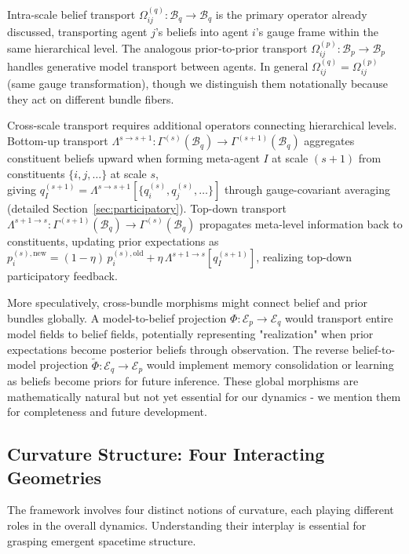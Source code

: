 \documentclass[11pt]{article}
\begin{document}
Intra-scale belief transport $\Omega^{(q)}_{ij}: \mathcal{B}_q \to \mathcal{B}_q$ is the primary operator already discussed, transporting agent $j$'s beliefs into agent $i$'s gauge frame within the same hierarchical level. The analogous prior-to-prior transport $\Omega^{(p)}_{ij}: \mathcal{B}_p \to \mathcal{B}_p$ handles generative model transport between agents. In general $\Omega^{(q)}_{ij} = \Omega^{(p)}_{ij}$ (same gauge transformation), though we distinguish them notationally because they act on different bundle fibers.

Cross-scale transport requires additional operators connecting hierarchical levels. Bottom-up transport $\Lambda^{s \to s+1}: \Gamma^{(s)}(\mathcal{B}_q) \to \Gamma^{(s+1)}(\mathcal{B}_q)$ aggregates constituent beliefs upward when forming meta-agent $I$ at scale $(s+1)$ from constituents $\{i,j,\ldots\}$ at scale $s$,\\ giving $q_I^{(s+1)} = \Lambda^{s \to s+1}[\{q_i^{(s)}, q_j^{(s)}, \ldots\}]$ through gauge-covariant averaging (detailed Section~\ref{sec:participatory}). Top-down transport $\Lambda^{s+1 \to s}: \Gamma^{(s+1)}(\mathcal{B}_q) \to \Gamma^{(s)}(\mathcal{B}_q)$ propagates meta-level information back to constituents, updating prior expectations as $p_i^{(s),\text{new}} = (1-\eta)\,p_i^{(s),\text{old}} + \eta\,\Lambda^{s+1 \to s}[q_I^{(s+1)}]$, realizing top-down participatory feedback.

More speculatively, cross-bundle morphisms might connect belief and prior bundles globally. A model-to-belief projection $\Phi: \mathcal{E}_p \to \mathcal{E}_q$ would transport entire model fields to belief fields, potentially representing "realization" when prior expectations become posterior beliefs through observation. The reverse belief-to-model projection $\tilde{\Phi}: \mathcal{E}_q \to \mathcal{E}_p$ would implement memory consolidation or learning as beliefs become priors for future inference. These global morphisms are mathematically natural but not yet essential for our dynamics - we mention them for completeness and future development.

\subsection{Curvature Structure: Four Interacting Geometries}

The framework involves four distinct notions of curvature, each playing different roles in the overall dynamics. Understanding their interplay is essential for grasping emergent spacetime structure.
\end{document}
